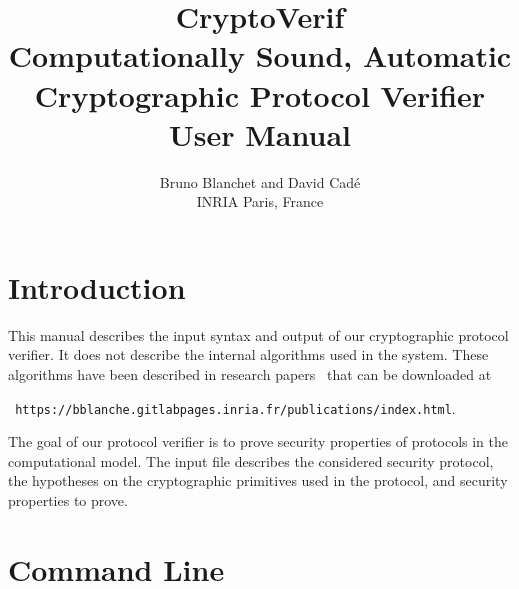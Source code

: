 \documentclass{article}
\begin{document}
\title{CryptoVerif\\
Computationally Sound, Automatic\\
Cryptographic Protocol Verifier\\
User Manual}

\author{Bruno Blanchet and David Cad{\'e}\\
INRIA Paris, France}

\maketitle

\tableofcontents

\section{Introduction}

This manual describes the input syntax and output of our cryptographic
protocol verifier. It does not describe the internal algorithms used
in the system. These algorithms have been described in research
papers~\cite{Blanchet06,BlanchetEPrint05,Blanchet06b,BlanchetPointchevalEPrint06}
that can be downloaded at

\centerline{{\tt
https://bblanche.gitlabpages.inria.fr/publications/index.html}.}

The goal of our protocol verifier is to prove security properties
of protocols in the computational model. The input file describes
the considered security protocol, the hypotheses on the cryptographic
primitives used in the protocol, and security properties to prove.

\section{Command Line}
\end{document}
